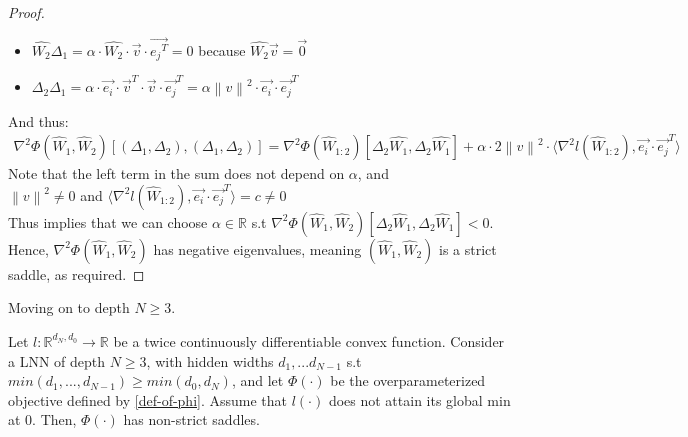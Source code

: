 \documentclass[12pt]{article}
\newcommand{\norm}[1]{\left\| #1 \right\|}
\begin{document}
\begin{proof}
\begin{itemize}
        \item $\widehat{W_2}\Delta_1 = \alpha \cdot \widehat{W_2} \cdot \overrightarrow{v} \cdot \overrightarrow{{e_j}^T} = 0$ because $\widehat{W_2}\overrightarrow{v} = \overrightarrow{0}$
        \item $\Delta_2 \Delta_1 = 
        \alpha \cdot \overrightarrow{e_i} \cdot {\overrightarrow{v}^T}
        \cdot \overrightarrow{v} \cdot {\overrightarrow{e_j}^T} = 
        \alpha {\norm{v}^2} \cdot \overrightarrow{e_i}\cdot{\overrightarrow{e_j}^T}$
    \end{itemize}
    And thus:
    \begin{align*}
        {{\nabla}^{2}}{\Phi}({\widehat{W}_1}, {\widehat{W}_2})[
        (\Delta_1,\Delta_2),
        (\Delta_1,\Delta_2)
        ]
        =
        {{\nabla}^{2}}{\Phi}({\widehat{W}_{1:2}})[
         {\Delta_2}\widehat{W_1},
         {\Delta_2}\widehat{W_1}
        ]
        +
        \alpha \cdot 2 \norm{v}^2 \cdot \langle
        {{\nabla}^{2}}{l}({\widehat{W}_{1:2}})
        ,
        \overrightarrow{e_i}\cdot{\overrightarrow{e_j}^T}
        \rangle
    \end{align*}
    Note that the left term in the sum does not depend on $\alpha$, and \\ ${\norm{v}^2}\neq 0$ and $\langle
    {{\nabla}^{2}}{l}({\widehat{W}_{1:2}})
    ,
    \overrightarrow{e_i}\cdot{\overrightarrow{e_j}^T}
    \rangle = c \neq 0$
    \\ 
    Thus implies that we can choose $\alpha \in \mathbb{R}$ s.t 
    ${{\nabla}^{2}}{\Phi}({\widehat{W}_1}, {\widehat{W}_2})[
    {\Delta_2}{\widehat{W}_1},
    {\Delta_2}{\widehat{W}_1}
    ] < 0$. Hence, ${{\nabla}^{2}}{\Phi}({\widehat{W}_1}, {\widehat{W}_2})$ has negative eigenvalues, meaning $({\widehat{W}_1}, {\widehat{W}_2})$ is a strict saddle, as required.
    \end{proof}
    Moving on to depth $N \geq 3$.
    \begin{proposition}
    Let $l:\mathbb{R}^{d_N,d_0} \to \mathbb{R}$ be a twice continuously differentiable convex function. Consider a LNN of depth $N \geq 3$, with hidden widths $d_1, ... d_{N-1}$ s.t $min(d_1,...,d_{N-1}) \geq min(d_0, d_N)$,
    and let $\Phi(\cdot)$ be the overparameterized objective defined by \eqref{def-of-phi}.
    Assume that $l(\cdot)$ does not attain its global min at $0$.
    Then, $\Phi(\cdot)$ has non-strict saddles.
    \end{proposition}
	
\end{document}
